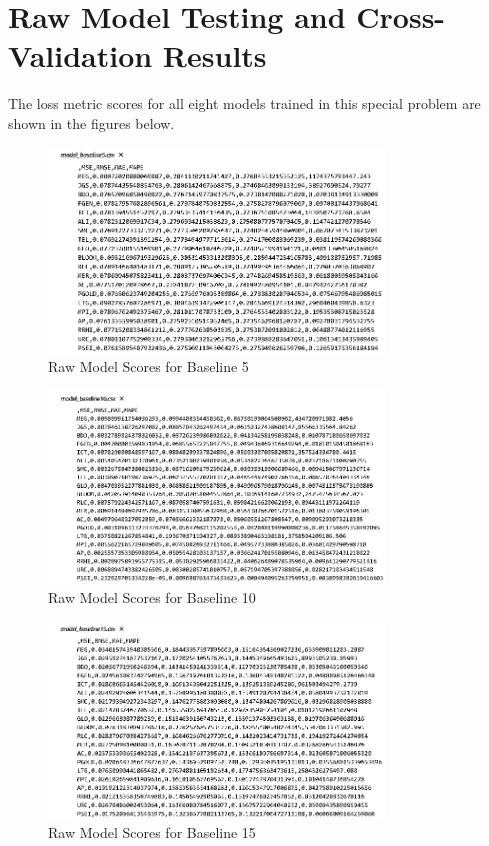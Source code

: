 \section{Raw Model Testing and Cross-Validation Results}
The loss metric scores for all eight models trained in this special problem are shown in the 
figures below.

\begin{figure}[ht]
    \centering
    \includegraphics[width=0.80\textwidth]{./assets/Appendices/B/RawScores/baseline5.png}
    \caption{Raw Model Scores for Baseline 5}
    \label{fig:rawScores_baseline5}
\end{figure}
\FloatBarrier

\begin{figure}[ht]
    \centering
    \includegraphics[width=0.80\textwidth]{./assets/Appendices/B/RawScores/baseline10.png}
    \caption{Raw Model Scores for Baseline 10}
    \label{fig:rawScores_baseline10}
\end{figure}
\FloatBarrier

\begin{figure}[ht]
    \centering
    \includegraphics[width=0.80\textwidth]{./assets/Appendices/B/RawScores/baseline15.png}
    \caption{Raw Model Scores for Baseline 15}
    \label{fig:rawScores_baseline15}
\end{figure}
\FloatBarrier

